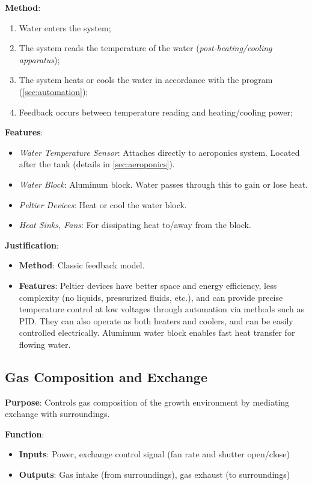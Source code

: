 \documentclass{report}
\begin{document}
\textbf{Method}:
\begin{enumerate}
    \item Water enters the system;
    \item The system reads the temperature of the water (\textit{post-heating/cooling apparatus});
    \item The system heats or cools the water in accordance with the program (\ref{sec:automation});
    \item Feedback occurs between temperature reading and heating/cooling power;
\end{enumerate}

\textbf{Features}:
\begin{itemize}
    \item \textit{Water Temperature Sensor}: Attaches directly to aeroponics system. Located after the tank (details in \ref{sec:aeroponics}).
    \item \textit{Water Block}: Aluminum block. Water passes through this to gain or lose heat.
    \item \textit{Peltier Devices}: Heat or cool the water block.
    \item \textit{Heat Sinks, Fans}: For dissipating heat to/away from the block.
\end{itemize}

\textbf{Justification}:
\begin{itemize}
    \item \textbf{Method}: Classic feedback model.
    \item \textbf{Features}: Peltier devices have better space and energy efficiency, less complexity (no liquids, pressurized fluids, etc.), and can provide precise temperature control at low voltages through automation via methods such as PID. They can also operate as both heaters and coolers, and can be easily controlled electrically. Aluminum water block enables fast heat transfer for flowing water.
\end{itemize}

\newpage

\subsection{Gas Composition and Exchange}
\label{sec:gas}

\textbf{Purpose}: Controls gas composition of the growth environment by mediating exchange with surroundings.

\textbf{Function}:
\begin{itemize}
    \item \textbf{Inputs}: Power, exchange control signal (fan rate and shutter open/close)
    \item \textbf{Outputs}: Gas intake (from surroundings), gas exhaust (to surroundings)
\end{itemize}
\end{document}
